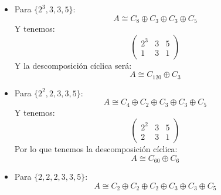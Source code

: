 \begin{ejemplo}
\begin{itemize}
\begin{equation*}
\begin{array}{cccc}
                        d_1 =& 2 & 3^2 & 5 \\
                        d_2 =&2 & 1 & 1 \\
                        d_3 =&2 & 1 & 1
                \end{array}\right)
            \end{equation*}
            Por lo que:
            \begin{equation*}
                A\cong C_{90} \oplus C_2 \oplus C_2
            \end{equation*}
        \item Para $\{2^3, 3,3,5\}$:
            \begin{equation*}
                A\cong C_8\oplus C_3\oplus C_3\oplus C_5
            \end{equation*}
            Y tenemos:
            \begin{equation*}
                \left(\begin{array}{ccc}
                    2^3 & 3 & 5 \\
                    1 & 3 & 1
                \end{array}\right)
            \end{equation*}
            Y la descomposición cíclica será:
            \begin{equation*}
                A\cong C_{120} \oplus C_3
            \end{equation*}
        \item Para $\{2^2,2,3,3,5\}$:
            \begin{equation*}
                A\cong C_4\oplus C_2\oplus C_3 \oplus C_3 \oplus C_5
            \end{equation*}
            Y tenemos:
            \begin{equation*}
                \left(\begin{array}{ccc}
                    2^2 & 3 & 5 \\
                    2 & 3 & 1
                \end{array}\right)
            \end{equation*}
            Por lo que tenemos la descomposición cíclica:
            \begin{equation*}
                A\cong C_{60} \oplus C_6
            \end{equation*}
        \item Para $\{2, 2, 2, 3, 3, 5\}$:
            \begin{equation*}
                A\cong C_2\oplus C_2\oplus C_2\oplus C_3\oplus C_3\oplus C_5

\end{equation*}
\end{itemize}
\end{ejemplo}
